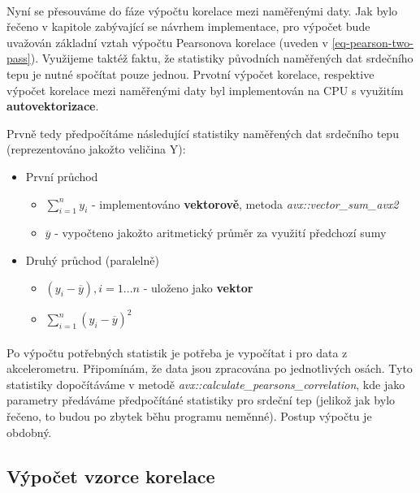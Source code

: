 \documentclass[12pt, a4paper]{article}
\begin{document}
\paragraph{} Nyní se přesouváme do fáze výpočtu korelace mezi naměřenými daty. 
Jak bylo řečeno v kapitole zabývající se návrhem implementace, pro výpočet bude uvažován základní vztah výpočtu Pearsonova korelace (uveden v \ref{eq-pearson-two-pass}).
Využijeme taktéž faktu, že statistiky původních naměřených dat srdečního tepu je nutné spočítat pouze jednou.
Prvotní výpočet korelace, respektive výpočet korelace mezi naměřenými daty byl implementován na CPU s využitím \textbf{autovektorizace}.

Prvně tedy předpočítáme následující statistiky naměřených dat srdečního tepu (reprezentováno jakožto veličina Y):
\begin{itemize}
  \item První průchod
    \begin{itemize}
      \item $\sum_{i=1}^{n}{y_i}$ - implementováno \textbf{vektorově}, metoda \textit{avx::vector\_sum\_avx2} 
      \item $\overline{y}$ - vypočteno jakožto aritmetický průměr za využití předchozí sumy
    \end{itemize}
  \item Druhý průchod (paralelně)
  \begin{itemize}
    \item $(y_i - \overline{y}), i=1...n$ - uloženo jako \textbf{vektor}
    \item $\sum_{i=1}^{n}(y_i - \overline{y})^2$  
  \end{itemize}
\end{itemize}

\paragraph{} Po výpočtu potřebných statistik je potřeba je vypočítat i pro data z akcelerometru. 
Připomínám, že data jsou zpracována po jednotlivých osách. 
Tyto statistiky dopočítáváme v metodě \textit{avx::calculate\_pearsons\_correlation}, kde jako parametry předáváme předpočítáné statistiky pro srdeční tep (jelikož jak bylo řečeno, to budou po zbytek běhu programu neměnné). 
Postup výpočtu je obdobný.

\subsection{Výpočet vzorce korelace}
\end{document}

